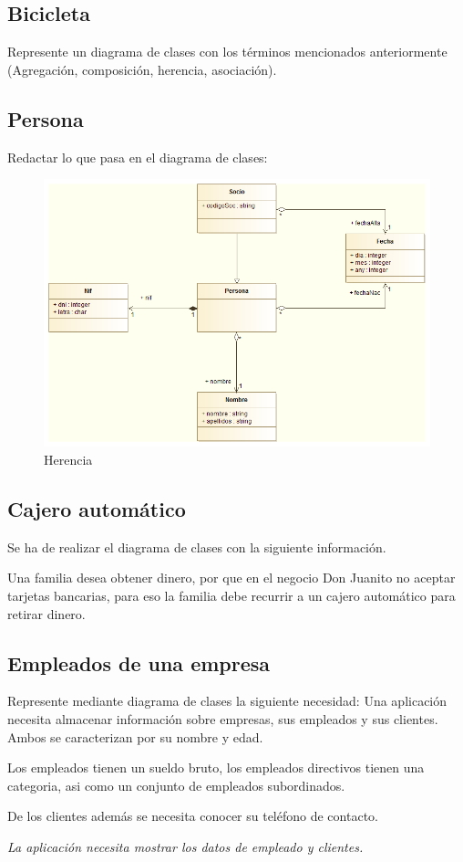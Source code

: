 \documentclass[12pt,letterpaper]{article}
\begin{document}
\subsection{\textbf{Bicicleta}}
Represente un diagrama de clases con los términos mencionados anteriormente (Agregación, composición, herencia, asociación).\\


\subsection{\textbf{Persona}}
Redactar lo que pasa en el diagrama de clases:
	\begin{figure}[H]
		\centering
		\includegraphics[scale=0.4]{img/personaUML.png}      
		\caption{Herencia}
	\label{fig:rc}
	\end{figure}
	\vspace{1cm}


\subsection{\textbf{Cajero automático}}
Se ha de realizar el diagrama de clases con la siguiente información.
\par Una familia desea obtener dinero, por que en el negocio Don Juanito no aceptar tarjetas bancarias, para eso la familia debe recurrir a un cajero automático para retirar dinero. \\

\subsection{\textbf{Empleados de una empresa}}
Represente mediante diagrama de clases la siguiente necesidad:
Una aplicación necesita almacenar información sobre empresas, sus empleados y sus clientes. Ambos se caracterizan por su nombre y edad.
\par Los empleados tienen un sueldo bruto, los empleados directivos tienen una categoria, asi como un conjunto de empleados subordinados.
\par De los clientes además se necesita conocer su teléfono de contacto.
\par \textit{La aplicación necesita mostrar los datos de empleado y clientes.}\\
\end{document}
